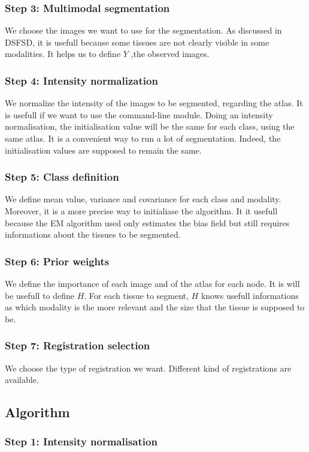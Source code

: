 \subsubsection{Step 3: Multimodal segmentation}
We choose the images we want to use for the segmentation. As discussed in DSFSD, it is usefull because some tissues are not clearly visible in some modalities. It helps us to define $Y$ ,the observed images.
%
\subsubsection{Step 4: Intensity normalization}
We normalize the intensity of the images to be segmented, regarding the atlas. It is usefull if we want to use the command-line module. Doing an intensity normalisation, the initialisation value will be the same for each class, using the same atlas. It is a convenient way to run a lot of segmentation. Indeed, the initialisation values are supposed to remain the same.
%
\subsubsection{Step 5: Class definition}
We define mean value, variance and covariance for each class and modality. Moreover, it is a more precise way to initialiase the algorithm. It it usefull because the EM algorithm used only estimates the bias field but still requires informations about the tissues to be segmented.
%
\subsubsection{Step 6: Prior weights}
We define the importance of each image and of the atlas for each node. It is will be usefull to define $H$. For each tissue to segment, $H$ knows usefull informations as which modality is the more relevant and the size that the tissue is supposed to be.
%
\subsubsection{Step 7: Registration selection}
We choose the type of registration we want. Different kind of registrations are available.

%
\subsection{Algorithm}

%
\subsubsection{Step 1: Intensity normalisation}

